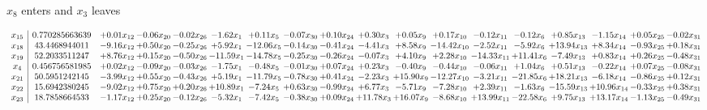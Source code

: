 \documentclass[9pt]{article}
\begin{document}
 $ x_{8} $ enters and $ x_{3} $ leaves 

 \[\begin{array}{c| c c@{\hskip 2pt} c@{\hskip 2pt} c@{\hskip 2pt} c@{\hskip 2pt} c@{\hskip 2pt} c@{\hskip 2pt} c@{\hskip 2pt} c@{\hskip 2pt} c@{\hskip 2pt} c@{\hskip 2pt} c@{\hskip 2pt} c@{\hskip 2pt} c@{\hskip 2pt} c@{\hskip 2pt} c@{\hskip 2pt} c@{\hskip 2pt} }
 x_{15}   &  0.770285663639 & +  0.01 x_{12} & -0.06 x_{20} & -0.02 x_{26} & -1.62 x_{1} & +  0.11 x_{5} & -0.07 x_{30} & +  0.10 x_{24} & +  0.30 x_{3} & +  0.05 x_{9} & +  0.17 x_{10} & -0.12 x_{11} & -0.12 x_{6} & +  0.85 x_{13} & -1.15 x_{14} & +  0.05 x_{25} & -0.02 x_{31}\\
 x_{18}   &  43.4468944011 & -9.16 x_{12} & +  0.50 x_{20} & -0.25 x_{26} & +  5.92 x_{1} & -12.06 x_{5} & -0.14 x_{30} & -0.41 x_{24} & -4.41 x_{3} & +  8.58 x_{9} & -14.42 x_{10} & -2.52 x_{11} & -5.92 x_{6} & + 13.94 x_{13} & +  8.34 x_{14} & -0.93 x_{25} & +  0.18 x_{31}\\
 x_{19}   &  52.2033511247 & +  8.76 x_{12} & +  0.15 x_{20} & -0.50 x_{26} & -11.59 x_{1} & -14.78 x_{5} & -0.25 x_{30} & -0.26 x_{24} & -0.07 x_{3} & +  4.10 x_{9} & +  2.28 x_{10} & -14.33 x_{11} & + 11.41 x_{6} & -7.49 x_{13} & +  0.83 x_{14} & +  0.26 x_{25} & -0.48 x_{31}\\
 x_{4}   &  0.456756581985 & +  0.02 x_{12} & -0.09 x_{20} & -0.03 x_{26} & -1.75 x_{1} & -0.48 x_{5} & -0.01 x_{30} & +  0.07 x_{24} & +  0.23 x_{3} & -0.40 x_{9} & -0.44 x_{10} & -0.06 x_{11} & +  1.04 x_{6} & +  0.51 x_{13} & -0.22 x_{14} & +  0.07 x_{25} & -0.08 x_{31}\\
 x_{21}   &  50.5951242145 & -3.99 x_{12} & +  0.55 x_{20} & -0.43 x_{26} & +  5.19 x_{1} & -11.79 x_{5} & -0.78 x_{30} & +  0.41 x_{24} & -2.23 x_{3} & + 15.90 x_{9} & -12.27 x_{10} & -3.21 x_{11} & -21.85 x_{6} & + 18.21 x_{13} & -6.18 x_{14} & -0.86 x_{25} & +  0.12 x_{31}\\
 x_{22}   &  15.6942380245 & -9.02 x_{12} & +  0.75 x_{20} & +  0.20 x_{26} & + 10.89 x_{1} & -7.24 x_{5} & +  0.63 x_{30} & -0.99 x_{24} & +  6.77 x_{3} & -5.71 x_{9} & -7.28 x_{10} & +  2.39 x_{11} & -1.63 x_{6} & -15.59 x_{13} & + 10.96 x_{14} & -0.33 x_{25} & +  0.38 x_{31}\\
 x_{23}   &  18.7858664533 & -1.17 x_{12} & +  0.25 x_{20} & -0.12 x_{26} & -5.32 x_{1} & -7.42 x_{5} & -0.38 x_{30} & +  0.09 x_{24} & + 11.78 x_{3} & + 16.07 x_{9} & -8.68 x_{10} & + 13.99 x_{11} & -22.58 x_{6} & +  9.75 x_{13} & + 13.17 x_{14} & -1.13 x_{25} & -0.49 x_{31}\\

\end{array}\]
\end{document}
